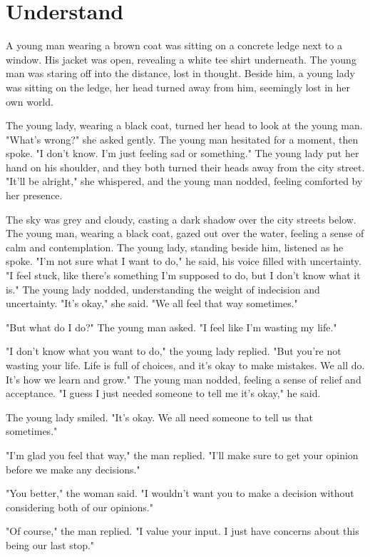 \documentclass[smalldemyvopaper,11pt,twoside,onecolumn,openright,extrafontsizes]{memoir}
\begin{document}
\chapter{Understand}
A young man wearing a brown coat was sitting on a concrete ledge next to a window. His jacket was open, revealing a white tee shirt underneath. The young man was staring off into the distance, lost in thought. Beside him, a young lady was sitting on the ledge, her head turned away from him, seemingly lost in her own world.\par
The young lady, wearing a black coat, turned her head to look at the young man. "What's wrong?" she asked gently. The young man hesitated for a moment, then spoke. "I don't know. I'm just feeling sad or something." The young lady put her hand on his shoulder, and they both turned their heads away from the city street. "It'll be alright," she whispered, and the young man nodded, feeling comforted by her presence.\par
The sky was grey and cloudy, casting a dark shadow over the city streets below. The young man, wearing a black coat, gazed out over the water, feeling a sense of calm and contemplation. The young lady, standing beside him, listened as he spoke. "I'm not sure what I want to do," he said, his voice filled with uncertainty. "I feel stuck, like there's something I'm supposed to do, but I don't know what it is." The young lady nodded, understanding the weight of indecision and uncertainty. "It's okay," she said. "We all feel that way sometimes."\par
"But what do I do?" The young man asked. "I feel like I'm wasting my life."\par
"I don't know what you want to do," the young lady replied. "But you're not wasting your life. Life is full of choices, and it's okay to make mistakes. We all do. It's how we learn and grow." The young man nodded, feeling a sense of relief and acceptance. "I guess I just needed someone to tell me it's okay," he said.\par
The young lady smiled. "It's okay. We all need someone to tell us that sometimes."\par
"I'm glad you feel that way," the man replied. "I'll make sure to get your opinion before we make any decisions."\par
"You better," the woman said. "I wouldn't want you to make a decision without considering both of our opinions."\par
"Of course," the man replied. "I value your input. I just have concerns about this being our last stop."\par
\end{document}
